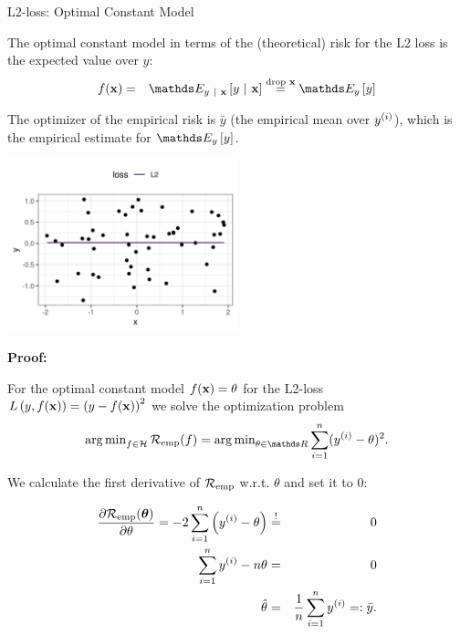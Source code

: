 \documentclass[11pt,compress,t,notes=noshow, xcolor=table]{beamer}
\begin{document}
\begin{vbframe}{L2-loss: Optimal Constant Model}

The optimal constant model in terms of the (theoretical) risk for the L2 loss is the expected value over $y$: 
  \begin{eqnarray*}
    \fx &=& \E_{y~|~\xv}\left[y~|~\xv\right] \overset{\text{drop } \xv}{=} \E_y \left[y\right] 
  \end{eqnarray*} 

The optimizer of the empirical risk is $\bar y$ (the empirical mean over $y^{(i)}$), which is the empirical estimate for $\E_y \left[y\right]$. 

\begin{center}
\includegraphics[width = 0.5\textwidth ]{figure/L2-loss.png} \\
\end{center}

\framebreak 

\textbf{Proof: }

\vspace{0.2cm}

For the optimal constant model $f(\mathbf{x}) = \theta$ for the L2-loss $L\left(y, f(\mathbf{x})\right) = \left(y - f(\mathbf{x})\right)^2$ we solve the optimization problem 
$$
\argmin_{f \in \Hspace} \riskef = \argmin_{\theta \in \R} \sumin (\yi - \theta)^2. 
$$


We calculate the first derivative of $\mathcal{R}_{\text{emp}}$ w.r.t. $\theta$ and set it to $0$: 


\begin{eqnarray*}
\frac{\partial \mathcal{R}_{\text{emp}}(\bm{\theta})}{\partial \theta} = -2 \sum\limits_{i=1}^n \left(y^{(i)} - \theta\right) &\overset{!}{=}& 0 \\
\sum\limits_{i=1}^n y^{(i)} - n \theta&=& 0 \\
\hat \theta&=& \frac{1}{n} \sum\limits_{i=1}^n y^{(i)} =: \bar y.
\end{eqnarray*}


\end{vbframe}
\end{document}
